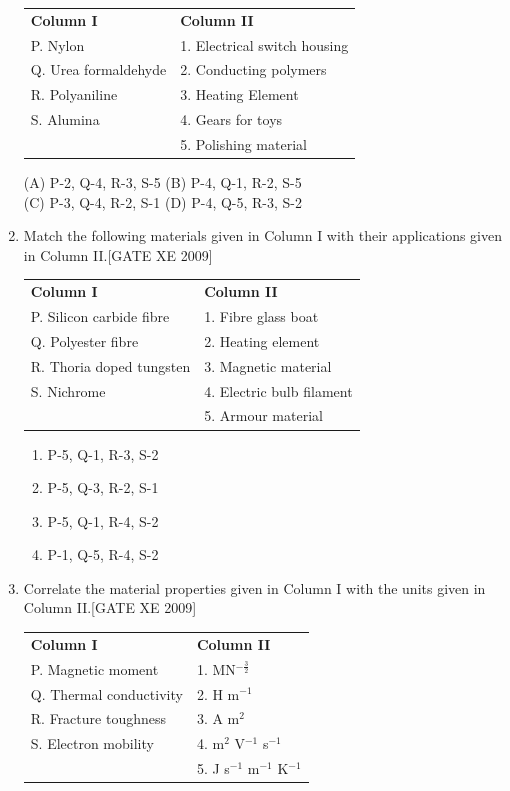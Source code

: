 \documentclass[journal,12pt,onecolumn]{IEEEtran}
\theoremstyle{remark}
\begin{document}
\begin{enumerate}
\begin{tabular}{p{6cm} p{6cm}}
\textbf{Column I} & \textbf{Column II} \\
P. Nylon & 1. Electrical switch housing \\
Q. Urea formaldehyde & 2. Conducting polymers \\
R. Polyaniline & 3. Heating Element \\
S. Alumina & 4. Gears for toys \\
& 5. Polishing material \\
\end{tabular}



\noindent
(A) P-2, Q-4, R-3, S-5 \hfill
(B) P-4, Q-1, R-2, S-5 \\
(C) P-3, Q-4, R-2, S-1 \hfill
(D) P-4, Q-5, R-3, S-2


\item Match the following materials given in Column I with their applications given in Column II.\hfill[GATE XE 2009]



\begin{tabular}{p{6cm} p{6cm}}
\textbf{Column I} & \textbf{Column II} \\
P. Silicon carbide fibre & 1. Fibre glass boat \\
Q. Polyester fibre & 2. Heating element \\
R. Thoria doped tungsten & 3. Magnetic material \\
S. Nichrome & 4. Electric bulb filament \\
& 5. Armour material \\
\end{tabular}



\begin{enumerate}
    

\item  P-5, Q-1, R-3, S-2 
\item P-5, Q-3, R-2, S-1 
\item P-5, Q-1, R-4, S-2
 \item P-1, Q-5, R-4, S-2 
\end{enumerate}

\item Correlate the material properties given in Column I with the units given in Column II.\hfill[GATE XE 2009]



\begin{tabular}{p{6cm} p{6cm}}
\textbf{Column I} & \textbf{Column II} \\
P. Magnetic moment & 1. MN$^{-\tfrac{3}{2}}$ \\
Q. Thermal conductivity & 2. H m$^{-1}$ \\
R. Fracture toughness & 3. A m$^2$ \\
S. Electron mobility & 4. m$^2$ V$^{-1}$ s$^{-1}$ \\
& 5. J s$^{-1}$ m$^{-1}$ K$^{-1}$ \\
\end{tabular}




\end{enumerate}
\end{document}
